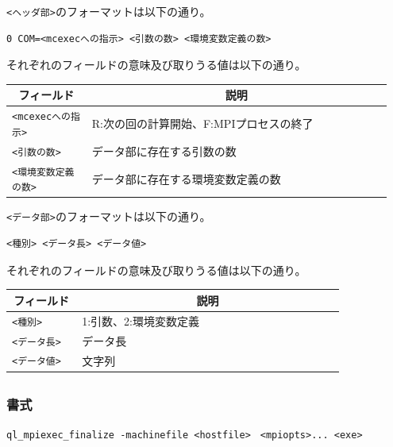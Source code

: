 \documentclass[twoside,11pt,fleqn]{book}
\begin{document}
\texttt{<ヘッダ部>}のフォーマットは以下の通り。
\begin{verbatim}
0 COM=<mcexecへの指示> <引数の数> <環境変数定義の数>
\end{verbatim}
%
それぞれのフィールドの意味及び取りうる値は以下の通り。
\begin{table}[!ht]
\footnotesize
\begin{tabular}{|p{0.20\linewidth}|p{0.75\linewidth}|} \hline
\multicolumn{1}{|c}{\textbf{フィールド}}&\multicolumn{1}{|c|}{\textbf{説明}}\\ \hline \hline
\texttt{<mcexecへの指示>}&R:次の回の計算開始、F:MPIプロセスの終了\\ \hline
\texttt{<引数の数>}&データ部に存在する引数の数\\ \hline
\texttt{<環境変数定義の数>}&データ部に存在する環境変数定義の数\\ \hline
\end{tabular}
\vspace{-0em}
\end{table}

\texttt{<データ部>}のフォーマットは以下の通り。
\begin{verbatim}
<種別> <データ長> <データ値>
\end{verbatim}
それぞれのフィールドの意味及び取りうる値は以下の通り。
\begin{table}[!ht]
\footnotesize
\begin{tabular}{|p{0.20\linewidth}|p{0.75\linewidth}|} \hline
\multicolumn{1}{|c}{\textbf{フィールド}}&\multicolumn{1}{|c|}{\textbf{説明}}\\ \hline \hline
\texttt{<種別>}&1:引数、2:環境変数定義\\ \hline
\texttt{<データ長>}&データ長\\ \hline
\texttt{<データ値>}&文字列\\ \hline
\end{tabular}
\vspace{-0em}
\end{table}

\subsection{}
\subsubsection*{書式}{\quad} \texttt{ql\_mpiexec\_finalize -machinefile <hostfile>　{\lbrack}<mpiopts>...{\rbrack}  <exe> }
\end{document}
